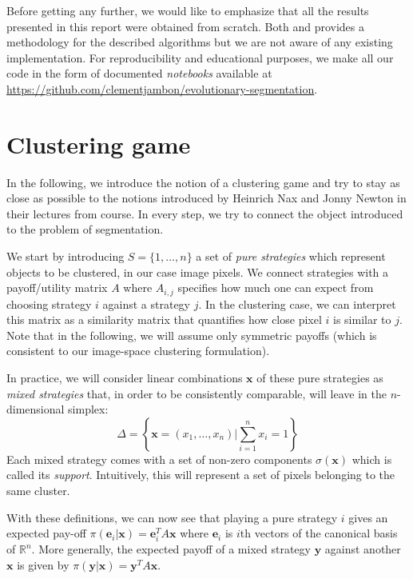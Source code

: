 \documentclass[11pt,a4paper]{article}
\begin{document}
Before getting any further, we would like to emphasize that all the results presented in this report were obtained from scratch. Both \cite{bulo-thesis} and \cite{game-clustering} provides a methodology for the described algorithms but we are not aware of any existing implementation. For reproducibility and educational purposes, we make all our code in the form of documented \textit{notebooks} available at \url{https://github.com/clementjambon/evolutionary-segmentation}. 

\section{Clustering game}
\label{sec:cluster-game}

In the following, we introduce the notion of a clustering game and try to stay as close as possible to the notions introduced by Heinrich Nax and Jonny Newton in their lectures from course\cite{course-gt}. In every step, we try to connect the object introduced to the problem of segmentation.

We start by introducing $S=\{1, \ldots, n\}$ a set of \textit{pure strategies} which represent objects to be clustered, in our case image pixels. We connect strategies with a payoff/utility matrix $A$ where $A_{i, j}$ specifies how much one can expect from choosing strategy $i$ against a strategy $j$. In the clustering case, we can interpret this matrix as a similarity matrix that quantifies how close pixel $i$ is similar to $j$. Note that in the following, we will assume only symmetric payoffs (which is consistent to our image-space clustering formulation). 

In practice, we will consider linear combinations $\mathbf{x}$ of these pure strategies as \textit{mixed strategies} that, in order to be consistently comparable, will leave in the $n$-dimensional simplex:
\begin{equation}
    \Delta = \left\{\mathbf{x} = (x_1, \ldots, x_n) | \sum_{i=1}^n x_i = 1\right\}
\end{equation}
Each mixed strategy comes with a set of non-zero components $\sigma(\mathbf{x})$ which is called its \textit{support}. Intuitively, this will represent a set of pixels belonging to the same cluster. 

With these definitions, we can now see that playing a pure strategy $i$ gives an expected pay-off $\pi(\mathbf{e}_i|\mathbf{x})=\mathbf{e}_i^TA\mathbf{x}$ where $\mathbf{e}_i$ is $i$th vectors of the canonical basis of $\mathbb{R}^n$. More generally, the expected payoff of a mixed strategy $\mathbf{y}$ against another $\mathbf{x}$ is given by $\pi(\mathbf{y}|\mathbf{x})=\mathbf{y}^TA\mathbf{x}$.
\end{document}
